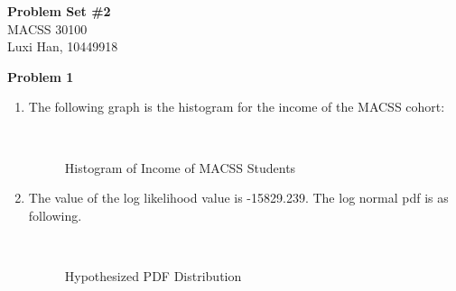 \documentclass[letterpaper,12pt]{article}
\theoremstyle{definition}
\numberwithin{equation}{section}
\begin{document}
\begin{flushleft}
   \textbf{\Large{Problem Set \#2}} \\
   MACSS 30100 \\
   Luxi Han, 10449918\\
\end{flushleft}

\noindent \textbf{\large Problem 1}\par

\begin{enumerate} [\bfseries (a)]
\item The following graph is the histogram for the income of the MACSS cohort:\\
	\begin{figure}[H]
    		\centering
		\
    		\caption{Histogram of Income of MACSS Students}
	\end{figure}\par
	
\item The value of the log likelihood value is -15829.239. The log normal pdf is as following.\par
	\begin{figure}[H]
    		\centering
		\
    		\caption{Hypothesized PDF Distribution}
	\end{figure}\par


\end{enumerate}
\end{document}
